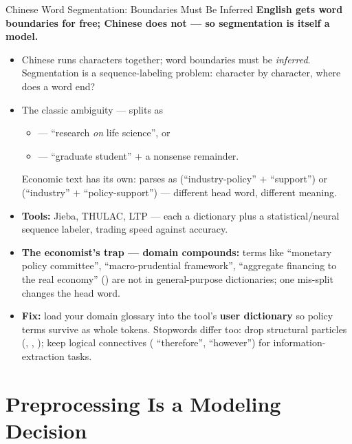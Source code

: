 \begin{frame}{Chinese Word Segmentation: Boundaries Must Be Inferred}
\small
\textbf{English gets word boundaries for free; Chinese does not --- so segmentation is itself a model.}
\begin{itemize}
\item Chinese runs characters together; word boundaries must be \emph{inferred}. Segmentation is a sequence-labeling problem: character by character, where does a word end?
\item The classic ambiguity ---  splits as
\begin{itemize}
    \item {} --- ``research \emph{on} life science'', or
    \item {} --- ``graduate student'' $+$ a nonsense remainder.
\end{itemize}
Economic text has its own:  parses as  (``industry-policy'' $+$ ``support'') or  (``industry'' $+$ ``policy-support'') --- different head word, different meaning.
\item \textbf{Tools:} Jieba, THULAC, LTP --- each a dictionary plus a statistical/neural sequence labeler, trading speed against accuracy.
\item \textbf{The economist's trap --- domain compounds:} terms like ``monetary policy committee'', ``macro-prudential framework'', ``aggregate financing to the real economy'' () are not in general-purpose dictionaries; one mis-split changes the head word.
\item \textbf{Fix:} load your domain glossary into the tool's \textbf{user dictionary} so policy terms survive as whole tokens. Stopwords differ too: drop structural particles (, , ); keep logical connectives ( ``therefore'',  ``however'') for information-extraction tasks.
\end{itemize}
\end{frame}

\section{Preprocessing Is a Modeling Decision}

